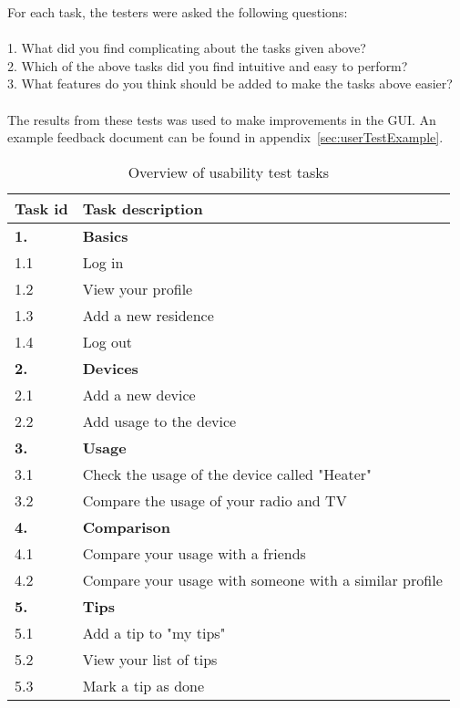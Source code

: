 For each task, the testers were asked the following questions:\\\\
1. What did you find complicating about the tasks given above?\\
2. Which of the above tasks did you find intuitive and easy to perform?\\
3. What features do you think should be added to make the tasks above easier?\\\\
The results from these tests was used to make improvements in the GUI. An example feedback document can be found in appendix~\ref{sec:userTestExample}.

\begin{table}[H]
\centering
\begin{tabular}{|l|p{10.5cm}|}
\hline
\textbf{Task id }& \textbf{Task description}\\\hline
\textbf{1.}&\textbf{Basics}\\\hline
1.1 & Log in\\\hline
1.2 & View your profile\\\hline
1.3 & Add a new residence\\\hline
1.4 & Log out\\\hline
\textbf{2.}&\textbf{Devices}\\\hline
2.1 & Add a new device\\\hline
2.2 & Add usage to the device\\\hline
\textbf{3.}&\textbf{Usage}\\\hline
3.1 & Check the usage of the device called "Heater"\\\hline
3.2 & Compare the usage of your radio and TV\\\hline
\textbf{4.}&\textbf{Comparison}\\\hline
4.1 & Compare your usage with a friends\\\hline
4.2 & Compare your usage with someone with a similar profile\\\hline
\textbf{5.}&\textbf{Tips}\\\hline
5.1 & Add a tip to "my tips"\\\hline
5.2 & View your list of tips\\\hline
5.3 & Mark a tip as done\\\hline
\end{tabular}
\caption{Overview of usability test tasks}
\label{tab:usabilityTests}
\end{table}